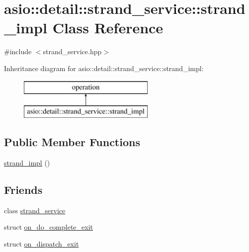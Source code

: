 \hypertarget{classasio_1_1detail_1_1strand__service_1_1strand__impl}{}\section{asio\+:\+:detail\+:\+:strand\+\_\+service\+:\+:strand\+\_\+impl Class Reference}
\label{classasio_1_1detail_1_1strand__service_1_1strand__impl}


{\ttfamily \#include $<$strand\+\_\+service.\+hpp$>$}

Inheritance diagram for asio\+:\+:detail\+:\+:strand\+\_\+service\+:\+:strand\+\_\+impl\+:\begin{figure}[H]
\begin{center}
\leavevmode
\includegraphics[height=2.000000cm]{classasio_1_1detail_1_1strand__service_1_1strand__impl}
\end{center}
\end{figure}
\subsection*{Public Member Functions}
\begin{DoxyCompactItemize}
\item 
\hyperlink{classasio_1_1detail_1_1strand__service_1_1strand__impl_a705fd5ec30f603a563caff35fb90936c}{strand\+\_\+impl} ()
\end{DoxyCompactItemize}
\subsection*{Friends}
\begin{DoxyCompactItemize}
\item 
class \hyperlink{classasio_1_1detail_1_1strand__service_1_1strand__impl_a1277f3ace68e6c0bc027b130c8885364}{strand\+\_\+service}
\item 
struct \hyperlink{classasio_1_1detail_1_1strand__service_1_1strand__impl_ae2c4b404800934e49953061db0c7cbb3}{on\+\_\+do\+\_\+complete\+\_\+exit}
\item 
struct \hyperlink{classasio_1_1detail_1_1strand__service_1_1strand__impl_ac356aaab6ba72db1ed853286c2afee93}{on\+\_\+dispatch\+\_\+exit}
\end{DoxyCompactItemize}


